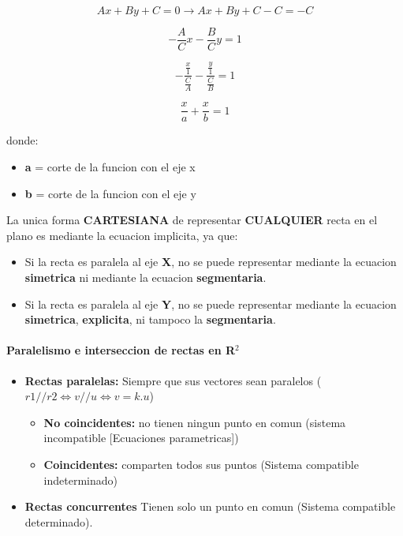 \documentclass[11pt]{article}
\begin{document}
\begin{equation}
	Ax + By + C = 0 \rightarrow Ax + By + C - C = - C
\end{equation}

\begin{equation}
	- \dfrac{A}{C} x - \dfrac{B}{C} y  = 1
\end{equation}

\begin{equation}
	- \dfrac{\frac{x}{1}}{\frac{C}{A}} - \dfrac{\frac{y}{1}}{\frac{C}{B}}  = 1
\end{equation}

\begin{equation}
	\dfrac{x}{a} + \dfrac{x}{b}  = 1
\end{equation}

donde:

\begin{itemize}
	\item \textbf{a} = corte de la funcion con el eje x
	\item \textbf{b} = corte de la funcion con el eje y
\end{itemize}

La unica forma \textbf{CARTESIANA} de representar \textbf{CUALQUIER} recta en el plano es mediante la ecuacion implicita, ya que:

\begin{itemize}
	\item Si la recta es paralela al eje \textbf{X}, no se puede representar mediante la ecuacion \textbf{simetrica} ni mediante la ecuacion \textbf{segmentaria}.
	\item Si la recta es paralela al eje \textbf{Y}, no se puede representar mediante la ecuacion \textbf{simetrica}, \textbf{explicita}, ni tampoco la \textbf{segmentaria}.
\end{itemize}

\paragraph{Paralelismo e interseccion de rectas en R$^2$}

\begin{itemize}
	\item \textbf{Rectas paralelas: } Siempre que sus vectores sean paralelos ($r1 // r2 \Leftrightarrow v // u \Leftrightarrow v = k.u $)
	\begin{itemize}
		\item \textbf{No coincidentes: }no tienen ningun punto en comun (sistema incompatible [Ecuaciones parametricas])
		\item \textbf{Coincidentes: }comparten todos sus puntos (Sistema compatible indeterminado)
	\end{itemize}
	\item \textbf{Rectas concurrentes} Tienen solo un punto en comun (Sistema compatible determinado).
\end{itemize}
\end{document}
